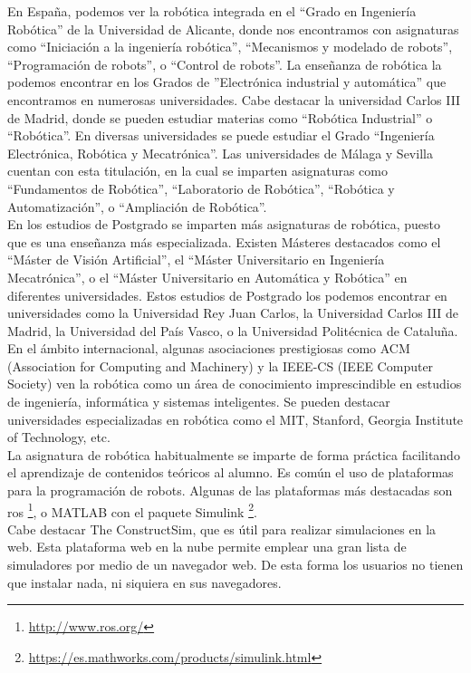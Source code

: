 En España, podemos ver la robótica integrada en el ``Grado en Ingeniería Robótica'' de la Universidad de Alicante, donde nos encontramos con asignaturas como ``Iniciación a la ingeniería robótica'', ``Mecanismos y modelado de robots'', ``Programación de robots'', o ``Control de robots''. La enseñanza de robótica la podemos encontrar en los Grados de ''Electrónica industrial y automática'' que encontramos en numerosas universidades. Cabe destacar la universidad Carlos III de Madrid, donde se pueden estudiar materias como ``Robótica Industrial'' o ``Robótica''. En diversas universidades se puede estudiar el Grado ``Ingeniería Electrónica, Robótica y Mecatrónica''. Las universidades de Málaga y Sevilla cuentan con esta titulación, en la cual se imparten asignaturas como ``Fundamentos de Robótica'', ``Laboratorio de Robótica'', ``Robótica y Automatización'', o ``Ampliación de Robótica''.\\

En los estudios de Postgrado se imparten más asignaturas de robótica, puesto que es una enseñanza más especializada. Existen Másteres destacados como el ``Máster de Visión Artificial'', el ``Máster Universitario en Ingeniería Mecatrónica'', o el ``Máster Universitario en Automática y Robótica'' en diferentes universidades. Estos estudios de Postgrado los podemos encontrar en universidades como la Universidad Rey Juan Carlos, la Universidad Carlos III de Madrid, la Universidad del País Vasco, o la Universidad Politécnica de Cataluña.\\

En el ámbito internacional, algunas asociaciones prestigiosas como ACM (Association for Computing and Machinery) y la IEEE-CS (IEEE Computer Society) ven la robótica como un área de conocimiento imprescindible en estudios de ingeniería, informática y sistemas inteligentes. Se pueden destacar universidades especializadas en robótica como el MIT, Stanford, Georgia Institute of Technology, etc.\\

La asignatura de robótica habitualmente se imparte de forma práctica facilitando el aprendizaje de contenidos teóricos al alumno. Es común el uso de plataformas para la programación de robots. Algunas de las plataformas más destacadas son \acrshort{ros} \footnote{\url{http://www.ros.org/}}, o MATLAB con el paquete Simulink \footnote{\url{https://es.mathworks.com/products/simulink.html}}.\\

Cabe destacar The ConstructSim, que es útil para realizar simulaciones en la web. Esta plataforma web en la nube permite emplear una gran lista de simuladores por medio de un navegador web. De esta forma los usuarios no tienen que instalar nada, ni siquiera en sus navegadores.

